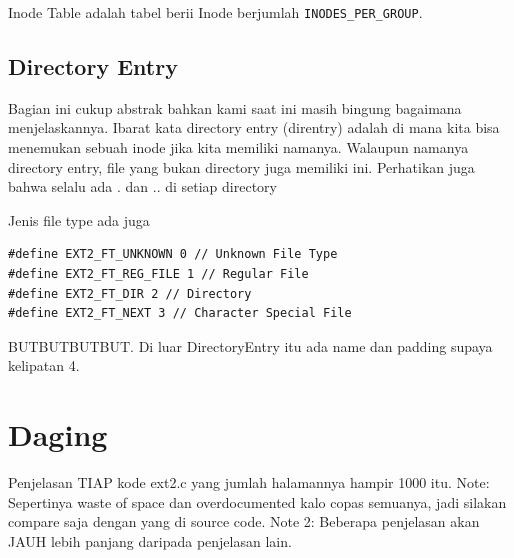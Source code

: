 Inode Table adalah tabel berii Inode berjumlah \texttt{INODES\_PER\_GROUP}.

\subsection{Directory Entry}

Bagian ini cukup abstrak bahkan kami saat ini masih bingung bagaimana menjelaskannya. Ibarat kata directory entry (direntry) adalah di mana kita bisa menemukan sebuah inode jika kita memiliki namanya. Walaupun namanya directory entry, file yang bukan directory juga memiliki ini. Perhatikan juga bahwa selalu ada . dan .. di setiap directory

Jenis file type ada juga

\begin{lstlisting}
#define EXT2_FT_UNKNOWN 0 // Unknown File Type
#define EXT2_FT_REG_FILE 1 // Regular File
#define EXT2_FT_DIR 2 // Directory
#define EXT2_FT_NEXT 3 // Character Special File
\end{lstlisting}

\begin{table}[htbp]
\centering
{}
\end{table}

BUTBUTBUTBUT. Di luar DirectoryEntry itu ada name dan padding supaya kelipatan 4.

\section{Daging}

Penjelasan TIAP kode ext2.c yang jumlah halamannya hampir 1000 itu.
Note: Sepertinya waste of space dan overdocumented kalo copas semuanya, jadi silakan compare saja dengan yang di source code.
Note 2: Beberapa penjelasan akan JAUH lebih panjang daripada penjelasan lain.

